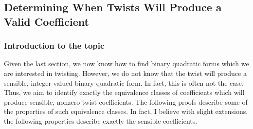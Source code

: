 \documentclass[11pt, oneside]{amsart}
\begin{document}
\subsection{Determining When Twists Will Produce a Valid Coefficient}
\subsubsection{Introduction to the topic}
Given the last section, we now know how to find binary quadratic forms which we are interested in twisting. However, we do not know that the twist will produce a sensible, integer-valued binary quadratic form. In fact, this is often not the case. Thus, we aim to identify exactly the equivalence classes of coefficients which will produce sensible, nonzero twist coefficients. The following proofs describe some of the properties of such equivalence classes. In fact, I believe with slight extensions, the following properties describe exactly the sensible coefficients.
\end{document}
